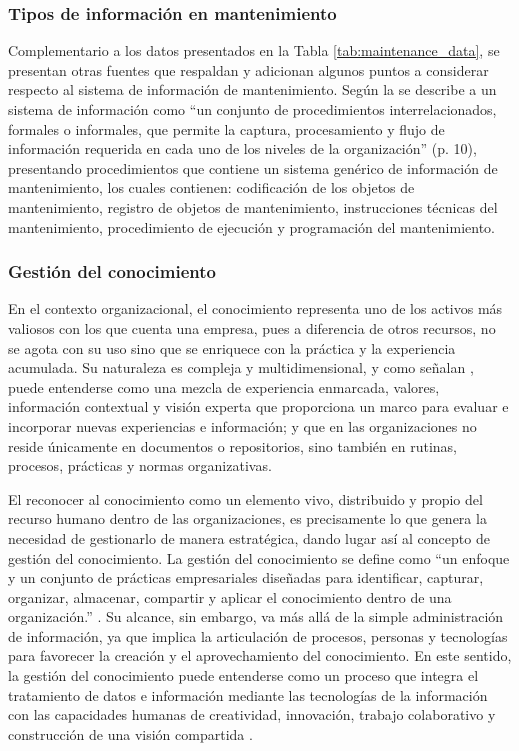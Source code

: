         \subsubsection{Tipos de información en mantenimiento}

            Complementario a los datos presentados en la Tabla \ref{tab:maintenance_data}, se presentan otras fuentes que respaldan y adicionan algunos puntos a considerar respecto al sistema de información de mantenimiento. Según la \textcite{COVENIN:1993} se describe a un sistema de información como “un conjunto de procedimientos interrelacionados, formales o informales, que permite la captura, procesamiento y flujo de información requerida en cada uno de los niveles de la organización” (p. 10), presentando procedimientos que contiene un sistema genérico de información de mantenimiento, los cuales contienen: codificación de los objetos de mantenimiento, registro de objetos de mantenimiento, instrucciones técnicas del mantenimiento, procedimiento de ejecución y programación del mantenimiento.
        
        \subsubsection{Gestión del conocimiento}

            En el contexto organizacional, el conocimiento representa uno de los activos más valiosos con los que cuenta una empresa, pues a diferencia de otros recursos, no se agota con su uso sino que se enriquece con la práctica y la experiencia acumulada. Su naturaleza es compleja y multidimensional, y como señalan \textcite{DAVENPORT:1998}, puede entenderse como una mezcla de experiencia enmarcada, valores, información contextual y visión experta que proporciona un marco para evaluar e incorporar nuevas experiencias e información; y que en las organizaciones no reside únicamente en documentos o repositorios, sino también en rutinas, procesos, prácticas y normas organizativas.

            El reconocer al conocimiento como un elemento vivo, distribuido y propio del recurso humano dentro de las organizaciones, es precisamente lo que genera la necesidad de gestionarlo de manera estratégica, dando lugar así al concepto de gestión del conocimiento. La gestión del conocimiento se define como “un enfoque y un conjunto de prácticas empresariales diseñadas para identificar, capturar, organizar, almacenar, compartir y aplicar el conocimiento dentro de una organización.” \parencite[p. 3]{RAMOS:2024}. Su alcance, sin embargo, va más allá de la simple administración de información, ya que implica la articulación de procesos, personas y tecnologías para favorecer la creación y el aprovechamiento del conocimiento. En este sentido, la gestión del conocimiento puede entenderse como un proceso que integra el tratamiento de datos e información mediante las tecnologías de la información con las capacidades humanas de creatividad, innovación, trabajo colaborativo y construcción de una visión compartida \parencite{MALHOTRA:2005}.

